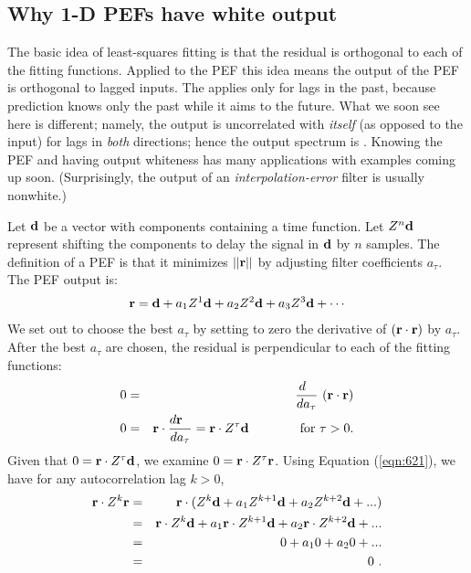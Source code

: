 \subsection{Why 1-D PEFs have white output}
\label{mda/'white_proof'}
The basic idea of least-squares fitting
is that the residual is orthogonal to each of the fitting functions.
Applied to the PEF this idea means
the output of the PEF is orthogonal to lagged inputs.
The  applies only for lags in the past,
because prediction knows only the past while it aims to the future.
What we soon see here is different;
namely, the output is uncorrelated with {\it itself}
(as opposed to the input) for lags in {\it both} directions;
hence the output spectrum is .
Knowing the PEF and having output whiteness has many applications with examples coming up soon.
(Surprisingly, the output of an {\em interpolation-error} filter is usually nonwhite.)
\par
Let $\bf d$ be a vector with components containing a time function.
Let $Z^n{\bf d}$ represent shifting the components to delay the signal
in ${\bf d}$ by $n$ samples.
The definition of a PEF is that it minimizes $||{\bf r}||$
by adjusting filter coefficients $a_\tau$.
The PEF output is:
\begin{eqnarray}
{\bf r } = {\bf d} + a_1 Z^1 {\bf d}
+ a_2 Z^2 {\bf d}
+ a_3 Z^3 {\bf d} + \cdots
\label{eqn:621}
\end{eqnarray}
We set out to choose the best  $a_\tau$ by setting to zero
the derivative of $({\bf r\cdot r})$ by  $a_\tau$.
After the best $a_\tau$ are chosen,
the residual is perpendicular to each of the fitting functions:
\begin{eqnarray}
0 &=& \frac{d\ \ }{d a_\tau}\ ({\bf r \cdot r}) 
\\
0 &=& {\bf r}\cdot \frac{d{\bf r\ \ }}{da_\tau} =
      {\bf r} \cdot Z^\tau {\bf d}
\quad \quad \quad \quad {\rm for}\ \tau >0.
\end{eqnarray}
Given that
$ 0= \bold r \cdot Z^\tau \bold d$,
we examine
$ 0= \bold r \cdot Z^\tau \bold r$.
Using Equation (\ref{eqn:621}),
we have for any autocorrelation lag $k > 0$,
\begin{eqnarray*}
{\bf r} \cdot Z^k {\bf r} &=&
{\bf r} \cdot ( Z^k {\bf d} + a_1 Z^{k+1} {\bf d}
+  a_2 Z^{k+2} {\bf d} + ... ) \\
&=& {\bf r} \cdot Z^k {\bf d} + a_1 {\bf r}  \cdot Z^{k+1} {\bf d}
+ a_2 {\bf r} \cdot Z^{k+2} {\bf d} + ... \\
&=& 0 + a_1 0 + a_2 0 + ... \\
&=& 0 \mbox{\ .}
\end{eqnarray*}
